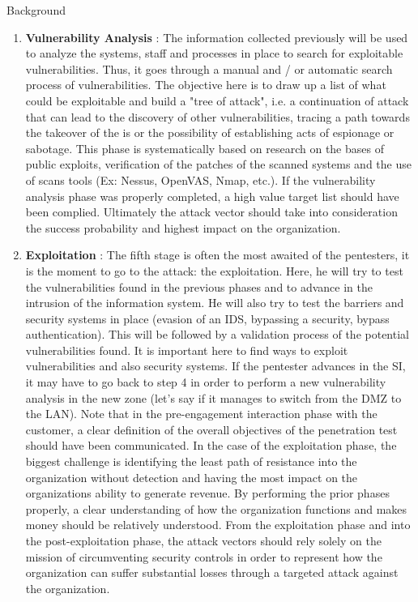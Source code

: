 \begin{chaptercover}{Background}
\begin{enumerate}
  \item \textbf{Vulnerability Analysis} : The information collected previously will be used to analyze the systems, staff and processes in place to search for exploitable vulnerabilities. Thus, it goes through a manual and / or automatic search process of vulnerabilities. The objective here is to draw up a list of what could be exploitable and build a "tree of attack", i.e. a continuation of attack that can lead to the discovery of other vulnerabilities, tracing a path towards the takeover of the \acrshort{is} or the possibility of establishing acts of espionage or sabotage. This phase is systematically based on research on the bases of public exploits, verification of the patches of the scanned systems and the use of scans tools (Ex: Nessus, OpenVAS, Nmap, etc.). If the vulnerability analysis phase was properly completed, a high value target list should have been complied. Ultimately the attack vector should take into consideration the success probability and highest impact on the organization.
  \item \textbf{Exploitation} : The fifth stage is often the most awaited of the pentesters, it is the moment to go to the attack: the exploitation. Here, he will try to test the vulnerabilities found in the previous phases and to advance in the intrusion of the information system. He will also try to test the barriers and security systems in place (evasion of an IDS, bypassing a security, bypass authentication). This will be followed by a validation process of the potential vulnerabilities found. It is important here to find ways to exploit vulnerabilities and also security systems. If the pentester advances in the SI, it may have to go back to step 4 in order to perform a new vulnerability analysis in the new zone (let's say if it manages to switch from the DMZ to the LAN). Note that in the pre-engagement interaction phase with the customer, a clear definition of the overall objectives of the penetration test should have been communicated. In the case of the exploitation phase, the biggest challenge is identifying the least path of resistance into the organization without detection and having the most impact on the organizations ability to generate revenue. By performing the prior phases properly, a clear understanding of how the organization functions and makes money should be relatively understood. From the exploitation phase and into the post-exploitation phase, the attack vectors should rely solely on the mission of circumventing security controls in order to represent how the organization can suffer substantial losses through a targeted attack against the organization.

\end{enumerate}
\end{chaptercover}
